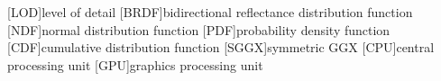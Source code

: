 [LOD]{level of detail}
[BRDF]{bidirectional reflectance distribution function}
[NDF]{normal distribution function}
[PDF]{probability density function}
[CDF]{cumulative distribution function}
[SGGX]{symmetric GGX}
[CPU]{central processing unit}
[GPU]{graphics processing unit}
